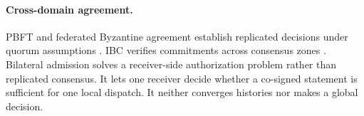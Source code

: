 \paragraph{Cross-domain agreement.}
PBFT and federated Byzantine agreement establish replicated decisions under
quorum assumptions \cite{castro1999pbft,mazieres2015stellar}. IBC verifies
commitments across consensus zones \cite{ibcCosmos}. Bilateral admission solves
a receiver-side authorization problem rather than replicated consensus. It
lets one receiver decide whether a co-signed statement is sufficient for one
local dispatch. It neither converges histories nor makes a global decision.
